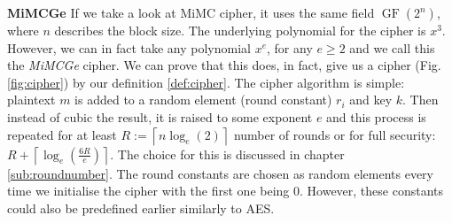 \documentclass{Resources/UoBLab1}
\theoremstyle{definition}
\begin{document}
\noindent\textbf{MiMCGe} If we take a look at MiMC cipher\cite{MiMC}, it uses the same field $\operatorname{GF}(2^n)$, where $n$ describes the block size. The underlying polynomial for the cipher is $x^3$. However, we can in fact take any polynomial $x^e$, for any $e \ge 2$ and we call this the \textit{MiMCGe} cipher. We can prove that this does, in fact, give us a cipher (Fig. \ref{fig:cipher}) by our definition \ref{def:cipher}. The cipher algorithm is simple: plaintext $m$ is added to a random element (round constant) $r_i$ and key $k$. Then instead of cubic the result, it is raised to some exponent $e$ and this process is repeated for at least $R := \left\lceil n\log_e(2) \right\rceil$ number of rounds or for full security: \(R + \left\lceil \log_e(\frac{6R}{e}) \right\rceil\). The choice for this is discussed in chapter \ref{sub:roundnumber}. The round constants are chosen as random elements every time we initialise the cipher with the first one being $0$. However, these constants could also be predefined earlier similarly to AES.
\end{document}
